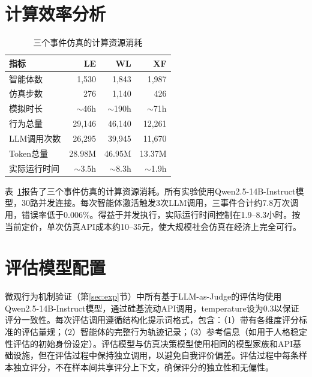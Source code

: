 \documentclass[lettersize,journal]{IEEEtran}
\begin{document}
\section{计算效率分析}

\begin{table}[!t]
\centering
\caption{三个事件仿真的计算资源消耗}
\label{tab:efficiency}
\renewcommand{\arraystretch}{1.0}
\begin{tabular}{@{}lrrr@{}}
\toprule
\textbf{指标} & \textbf{LE} & \textbf{WL} & \textbf{XF} \\
\midrule
智能体数 & 1,530 & 1,843 & 1,987 \\
仿真步数 & 276 & 1,140 & 426 \\
模拟时长 & $\sim$46h & $\sim$190h & $\sim$71h \\
行为总量 & 29,146 & 46,140 & 12,261 \\
LLM调用次数 & 26,295 & 39,945 & 11,670 \\
Token总量 & 28.98M & 46.95M & 13.37M \\
实际运行时间 & $\sim$3.5h & $\sim$8.3h & $\sim$1.9h \\
\bottomrule
\end{tabular}
\end{table}

表~\ref{tab:efficiency}报告了三个事件仿真的计算资源消耗。所有实验使用Qwen2.5-14B-Instruct模型，30路并发连接。每次智能体激活触发3次LLM调用，三事件合计约7.8万次调用，错误率低于0.006\%。得益于并发执行，实际运行时间控制在1.9--8.3小时。按当前定价，单次仿真API成本约10--35元，使大规模社会仿真在经济上完全可行。

\section{评估模型配置}

微观行为机制验证（第\ref{sec:exp}节）中所有基于LLM-as-Judge的评估均使用Qwen2.5-14B-Instruct模型，通过硅基流动API调用，temperature设为0.3以保证评分一致性。每次评估调用遵循结构化提示词格式，包含：（1）带有各维度评分标准的评估量规；（2）智能体的完整行为轨迹记录；（3）参考信息（如用于人格稳定性评估的初始身份设定）。评估模型与仿真决策模型使用相同的模型家族和API基础设施，但在评估过程中保持独立调用，以避免自我评价偏差。评估过程中每条样本独立评分，不在样本间共享评分上下文，确保评分的独立性和无偏性。
\end{document}
